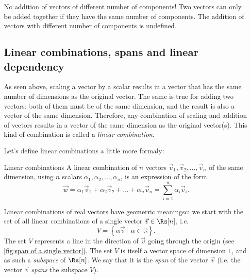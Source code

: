 
\begin{note}{No addition of vectors of different number of components!}{}
	Two vectors can only be added together if they have the same number of components. The addition of vectors with different number of components is undefined.
\end{note}

\subsection{Linear combinations, spans and linear dependency}
As seen above, scaling a vector by a scalar results in a vector that has the same number of dimensions as the original vector. The same is true for adding two vectors: both of them must be of the same dimension, and the result is also a vector of the same dimension. Therefore, any combination of scaling and addition of vectors results in a vector of the same dimension as the original vector(s). This kind of combination is called a \emph{linear combination}.

Let's define linear combinations a little more formaly:

\begin{definition}{Linear combinations}{}
	A linear combination of $n$ vectors $\vec{v}_{1}, \vec{v}_{2}, \dots, \vec{v}_{n}$ of the same dimension, using $n$ scalars $\alpha_{1},\alpha_{2},\dots,\alpha_{n}$, is an expression of the form
	\begin{equation}
		\vec{w} = \alpha_{1}\vec{v}_{1} + \alpha_{2}\vec{v}_{2} + \dots + \alpha_{n}\vec{v}_{n} = \sum\limits_{i=1}^{n}\alpha_{i}\vec{v}_{i}.
		\label{eq:linear combination}
	\end{equation}
\end{definition}

Linear combinations of real vectors have geometric meaningsc: we start with the set of all linear combinations of a single vector $\vec{v}\in\Rs[n]$, i.e.
\begin{equation}
	V = \left\{\alpha\vec{v} \mid \alpha\in\mathbb{R} \right\}.
	\label{eq:span of a single vector}
\end{equation}
The set $V$ represents a line in the direction of $\vec{v}$ going through the origin (see \autoref{fig:span of a single vector}). The set $V$ is itself a vector space of dimension $1$, and as such a \emph{subspace} of $\Rs[n]$. We say that it is the \emph{span} of the vector $\vec{v}$ (i.e. the vector $\vec{v}$ \emph{spans} the subspace $V$).

